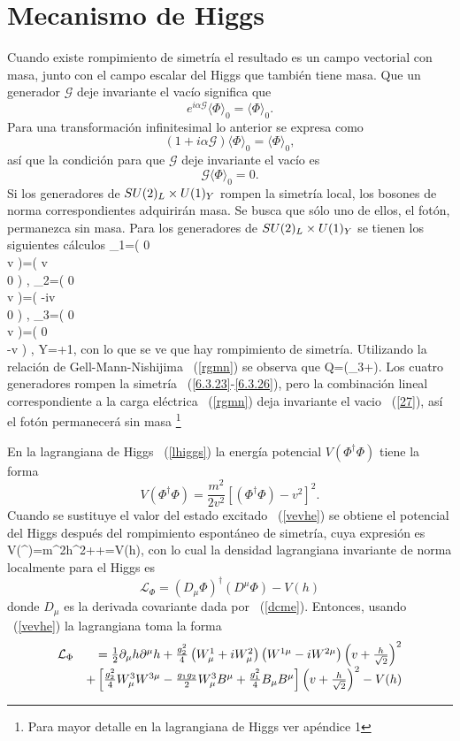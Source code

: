 \chapter{Mecanismo de Higgs}
Cuando existe rompimiento de simetr\'ia el resultado es un campo 
vectorial con masa, junto con el campo escalar del Higgs que tambi\'en tiene 
masa. Que un generador $\mathcal{G}$ deje invariante el vac\'io significa que 
$$
e^{i\alpha \mathcal{G}}\langle\Phi \rangle_0=\langle\Phi\rangle_0.
$$
Para una transformaci\'on infinitesimal lo anterior se  expresa como
$$
(1+i\alpha \mathcal{G})\langle\Phi\rangle_0=\langle\Phi\rangle_0,
$$
as\'i que la condici\'on para que $\mathcal{G}$ deje invariante el vac\'io es 
$$
\mathcal{G}\langle\Phi\rangle_0=0.
$$
Si los generadores de $\gme$ rompen la simetr\'ia local, los bosones de norma
correspondientes adquirir\'an masa. Se busca que s\'olo uno de ellos, el 
fot\'on, permanezca sin masa. Para los generadores de $\gme$ se tienen los 
siguientes c\'alculos
\be\label{6.3.23}
\tau_1\vevh=\mpi\left( 0\\ v \ea\right)=\left( v\\ 0 \ea\right)
,
\ee
\be\label{6.3.24}
\tau_2\vevh=\mpii\left( 0\\ v \ea\right)=\left( -iv\\ 0 \ea\right)
,
\ee
\be\label{6.3.25}
\tau_3\vevh=\mpiii\left( 0\\ v \ea\right)=\left( 0\\ -v \ea\right)
,
\ee
\be\label{6.3.26}
Y\vevh=+1\vevh{},
\ee
con lo que se ve que hay rompimiento de simetr\'ia. Utilizando la relaci\'on de
Gell-Mann-Nishijima ~(\ref{rgmn}) se observa que
\be\label{27}
Q\vevh=\left(\tau_3+\right).
\ee
Los cuatro generadores rompen la simetr\'ia ~(\ref{6.3.23}-\ref{6.3.26}), pero 
la combinaci\'on lineal correspondiente a la carga el\'ectrica ~(\ref{rgmn}) 
deja invariante el vacio ~(\ref{27}), as\'i el fot\'on permanecer\'a sin masa
\footnote{Para mayor detalle en la lagrangiana de Higgs ver ap\'endice 1} 

En la lagrangiana de Higgs ~(\ref{lhiggs}) la energ\'ia potencial
$V(\Phi^{\dag}\Phi)$ tiene la forma
$$
V(\Phi^{\dag}\Phi)=\frac{m^2}{2v^2}[(\Phi^{\dag}\Phi)-v^2]^2.
$$
Cuando se sustituye el valor del estado excitado ~(\ref{vevhe}) se obtiene el
potencial del Higgs despu\'es del rompimiento espont\'aneo de simetr\'ia, cuya
expresi\'on es
\be\label{phdres}
V(\Phi^{\dag}\Phi)=m^2h^2++=V(h),
\ee
con lo cual la densidad lagrangiana invariante de norma localmente para el 
Higgs es
$$
\mathcal{L}_{\Phi}=(D_{\mu}\Phi)^{\dag}(D^{\mu}\Phi)-V(h)
$$
donde $D_{\mu}$ es la derivada covariante dada por ~(\ref{dcme}). Entonces, 
usando ~(\ref{vevhe}) la lagrangiana toma la forma
$$\ba{lr}
\mathcal{L}_{\Phi}&=\frac{1}{2}\partial_{\mu}h\partial^{\mu}h+\frac{g^2_2}{4}
\left(W^1_{\mu}+iW^2_{\mu}\right)\left(W^{1\mu}-iW^{2\mu}\right)\left(v+
\frac{h}{\sqrt{2}}\right)^2\\ &+\left[\frac{g^2_2}{4}W^3_{\mu}W^{3\mu}-
\frac{g_1g_2}{2}W^3_{\mu}B^{\mu}+\frac{g^2_1}{4}B_{\mu}B^{\mu}\right]\left(v+
\frac{h}{\sqrt{2}}\right)^2-V(h)\ea
$$

